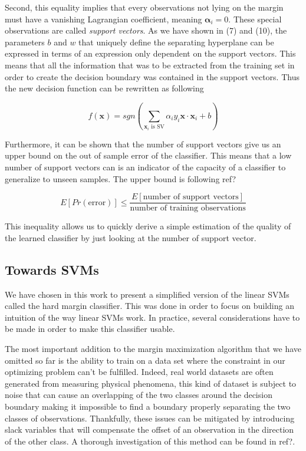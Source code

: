 Second, this equality implies that every observations not lying on the margin must have a vanishing Lagrangian coefficient, meaning $\boldsymbol{\alpha}_i = 0$. These special observations are called \textit{support vectors}. As we have shown in (7) and (10), the parameters $b$ and $w$ that uniquely define the separating hyperplane can be expressed in terms of an expression only dependent on the support vectors. This means that all the information that was to be extracted from the training set in order to create the decision boundary was contained in the support vectors. Thus the new decision function can be rewritten as following

\begin{equation}
  f(\mathbf{x}) = sgn\left(\sum_{\mathbf{x}_i \text{ is SV}}\alpha_iy_i\mathbf{x} \cdot \mathbf{x}_i + b\right)
\end{equation}

Furthermore, it can be shown that the number of support vectors give us an upper bound on the out of sample error of the classifier. This means that a low number of support vectors can is an indicator of the capacity of a classifier to generalize to unseen samples. The upper bound is following \textcolor[rgb]{1,0,0}{ref?}

\begin{equation}
  E\left[Pr\left(\text{error}\right)\right] \leq \frac{E\left[\text{number of support vectors}\right]}{\text{number of training observations}}
\end{equation}

This inequality allows us to quickly derive a simple estimation of the quality of the learned classifier by just looking at the number of support vector.

\subsection{Towards SVMs}

We have chosen in this work to present a simplified version of the linear SVMs called the hard margin classifier. This was done in order to focus on building an intuition of the way linear SVMs work. In practice, several considerations have to be made in order to make this classifier usable.

The most important addition to the margin maximization algorithm that we have omitted so far is the ability to train on a data set where the constraint in our optimizing problem can't be fulfilled. Indeed, real world datasets are often generated from measuring physical phenomena, this kind of dataset is subject to noise that can cause an overlapping of the two classes around the decision boundary making it impossible to find a boundary properly separating the two classes of observations. Thankfully, these issues can be mitigated by introducing slack variables that will compensate the offset of an observation in the direction of the other class. A thorough investigation of this method can be found in \textcolor[rgb]{1,0,0}{ref?}.

